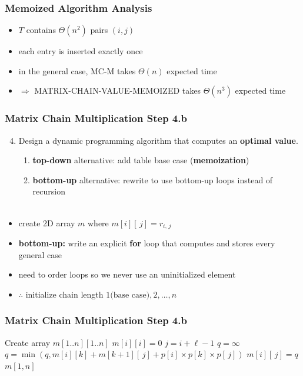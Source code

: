 \documentclass{beamer}
\newcommand{\stanza}{ \\~\ }
\begin{document}
\begin{frame} \frametitle{Memoized Algorithm Analysis}
  \begin{itemize}
    \item $T$ contains $\Theta(n^2)$ pairs $(i, j)$
    \item each entry is inserted exactly once
    \item in the general case, MC-M takes $\Theta(n)$ expected time
    \item $\Rightarrow$ MATRIX-CHAIN-VALUE-MEMOIZED takes $\Theta(n^3)$ expected time
  \end{itemize}
\end{frame}

\begin{frame} \frametitle{Matrix Chain Multiplication Step 4.b}
  \begin{enumerate}
    \setcounter{enumi}{3}
    \item Design a dynamic programming algorithm that computes an \textbf{optimal value}.
    \begin{enumerate}
      \item \textbf{top-down} alternative: add table base case (\textbf{memoization})
      \item \textbf{bottom-up} alternative: rewrite to use bottom-up loops instead of recursion
      \stanza
    \end{enumerate}
\end{enumerate}

\begin{itemize}
  \item create 2D array $m$ where $m[i][\, j] = r_{i, \, j}$
  \item \textbf{bottom-up:} write an explicit \textbf{for} loop that computes and stores every general case
  \item need to order loops so we never use an uninitialized element
  \item $\therefore$ initialize chain length $1 \text{(base case)}, 2, \ldots, n$
\end{itemize}
\end{frame}

\begin{frame} \frametitle{Matrix Chain Multiplication Step 4.b}
  {\small
  \begin{algorithmic}[1]
    \State Create array $m[1..n][1..n]$
      \State $m[i][i] = 0$ 
    \EndFor
     
        \State $j = i + \ell - 1$
        \State $q=\infty$
          \State $q = \min(q, m[i][k] + m[k+1][\,j] + p[i] \times p[k] \times p[\,j])$
        \EndFor
        \State $m[i][\,j] = q$
      \EndFor
    \EndFor
    \State \Return $m[1, n]$
    \EndFunction
  \end{algorithmic}
  }
\end{frame}
\end{document}
